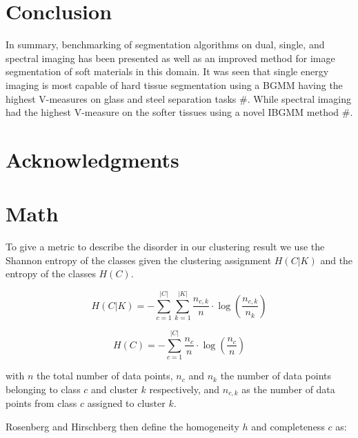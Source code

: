 \documentclass[a4paper,11pt]{article}
\begin{document}
\section{Conclusion}

In summary, benchmarking of segmentation algorithms on dual, single, and spectral imaging has been presented as well as an improved method for image segmentation of soft materials in this domain. It was seen that single energy imaging is most capable of hard tissue segmentation using a BGMM having the highest V-measures on glass and steel separation tasks \#. While spectral imaging had the highest V-measure on the softer tissues using a novel IBGMM method \#.


\section*{Acknowledgments}

\appendix{}
\section{Math}

To give a metric to describe the disorder in our clustering result we use the Shannon entropy of the classes given the clustering assignment $H(C|K)$ and the entropy of the classes  $H(C)$.

\begin{equation}
H(C|K) = - \sum_{c=1}^{|C|} \sum_{k=1}^{|K|} \frac{n_{c,k}}{n}
\cdot \log\left(\frac{n_{c,k}}{n_k}\right)
\end{equation}

\begin{equation}
H(C) = - \sum_{c=1}^{|C|} \frac{n_c}{n} \cdot \log\left(\frac{n_c}{n}\right)
\end{equation}

with $n$ the total number of data points, $n_c$ and $n_k$ the number of data points belonging to class $c$ and cluster $k$ respectively, and $n_{c,k}$ as the number of data points from class $c$ assigned to cluster $k$.

Rosenberg and Hirschberg then define the homogeneity $h$ and completeness $c$ as:

    
\end{document}
